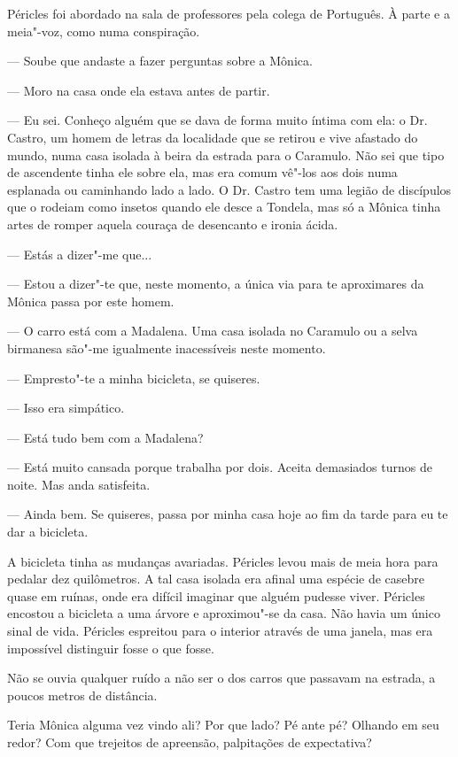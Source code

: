 Péricles foi abordado na sala de professores pela colega de Português. À
parte e a meia"-voz, como numa conspiração.

--- Soube que andaste a fazer perguntas sobre a Mônica.

--- Moro na casa onde ela estava antes de partir.

--- Eu sei. Conheço alguém que se dava de forma muito íntima com ela: o
  Dr. Castro, um homem de letras da localidade que se retirou e vive
  afastado do mundo, numa casa isolada à beira da estrada para o
  Caramulo. Não sei que tipo de ascendente tinha ele sobre ela, mas era
  comum vê"-los aos dois numa esplanada ou caminhando lado a lado. O Dr.
  Castro tem uma legião de discípulos que o rodeiam como insetos
  quando ele desce a Tondela, mas só a Mônica tinha artes de romper
  aquela couraça de desencanto e ironia ácida.

--- Estás a dizer"-me que...

--- Estou a dizer"-te que, neste momento, a única via para te aproximares
  da Mônica passa por este homem.

--- O carro está com a Madalena. Uma casa isolada no Caramulo ou a selva
  birmanesa são"-me igualmente inacessíveis neste momento.

--- Empresto"-te a minha bicicleta, se quiseres.

--- Isso era simpático.

--- Está tudo bem com a Madalena?


--- Está muito cansada porque trabalha por dois. Aceita demasiados turnos
  de noite. Mas anda satisfeita.

--- Ainda bem. Se quiseres, passa por minha casa hoje ao fim da tarde para
  eu te dar a bicicleta.


A bicicleta tinha as mudanças avariadas. Péricles levou mais de meia
hora para pedalar dez quilômetros. A tal casa isolada era afinal uma
espécie de casebre quase em ruínas, onde era difícil imaginar que alguém
pudesse viver. Péricles encostou a bicicleta a uma árvore e aproximou"-se
da casa. Não havia um único sinal de vida. Péricles espreitou para o
interior através de uma janela, mas era impossível distinguir fosse o
que fosse.

Não se ouvia qualquer ruído a não ser o dos carros que passavam na
estrada, a poucos metros de distância.

Teria Mônica alguma vez vindo ali? Por que lado? Pé ante pé? Olhando em
seu redor? Com que trejeitos de apreensão, palpitações de expectativa?

